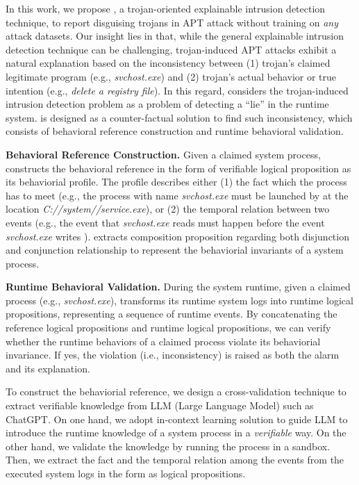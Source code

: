 In this work, we propose \tool,
a trojan-oriented explainable intrusion detection technique,
to report disguising trojans in APT attack without training on \textit{any} attack datasets.
Our insight lies in that,
while the general explainable intrusion detection technique can be challenging,
trojan-induced APT attacks exhibit a natural explanation based on
the inconsistency between 
(1) trojan's claimed legitimate program (e.g., \textit{svchost.exe}) and
(2) trojan's actual behavior or true intention (e.g., \textit{delete a registry file}).
In this regard, 
\tool considers the trojan-induced intrusion detection problem as a problem of
detecting a ``lie'' in the runtime system.
\tool is designed as a counter-factual solution to find such inconsistency,
which consists of 
behavioral reference construction and
runtime behavioral validation.

\noindent\textbf{Behavioral Reference Construction.}
Given a claimed system process, \tool constructs the behavioral reference in the form of 
verifiable logical proposition as its behaviorial profile.
The profile describes either
(1) the fact which the process has to meet (e.g., the process with name \textit{svchost.exe} must be launched by \textit{} at the location \textit{C://system//service.exe}), or
(2) the temporal relation between two events 
(e.g., the event that \textit{svchost.exe} reads  must happen before the event \textit{svchost.exe} writes ).
\tool extracts composition proposition regarding both disjunction and conjunction relationship
to represent the behaviorial invariants of a system process.

\noindent\textbf{Runtime Behavioral Validation.}
During the system runtime,
given a claimed process (e.g., \textit{svchost.exe}),
\tool transforms its runtime system logs into runtime logical propositions, 
representing a sequence of runtime events.
By concatenating the reference logical propositions and runtime logical propositions,
we can verify whether the runtime behaviors of a claimed process violate its behaviorial invariance.
If yes, the violation (i.e., inconsistency) is raised as both the alarm and its explanation.


To construct the behaviorial reference, 
we design a cross-validation technique to extract verifiable knowledge from LLM (Large Language Model) such as ChatGPT.
On one hand, 
we adopt in-context learning solution to guide LLM to 
introduce the runtime knowledge of a system process in a \textit{verifiable} way.
On the other hand,
we validate the knowledge by running the process in a sandbox.
Then, we extract the fact and the temporal relation among the events from the executed system logs
in the form as logical propositions.


